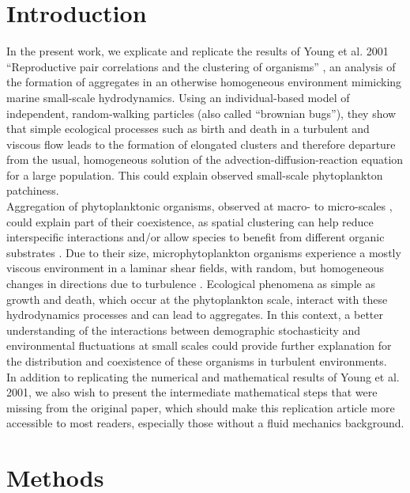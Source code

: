 
\section*{Introduction}

In the present work, we explicate and replicate the results of Young et al. 2001 ``Reproductive pair correlations and the clustering of organisms'' \cite{young_reproductive_2001}, an analysis of the formation of aggregates in an otherwise homogeneous environment mimicking marine small-scale hydrodynamics. Using an individual-based model of independent, random-walking particles (also called ``brownian bugs''), they show that simple ecological processes such as birth and death in a turbulent and viscous flow leads to the formation of elongated clusters and therefore departure from the usual, homogeneous solution of the advection-diffusion-reaction equation for a large population. This could explain observed small-scale phytoplankton patchiness. \\

Aggregation of phytoplanktonic organisms, observed at macro- to micro-scales \citep{lovejoy_universal_2001,pinel2007spatial}, could explain part of their coexistence, as spatial clustering can help reduce interspecific interactions \citep{font-munoz_advection_2017} and/or allow species to benefit from different organic substrates \citep{seymour_resource_2009}. Due to their size, microphytoplankton organisms experience a mostly viscous environment in a laminar shear fields, with random, but homogeneous changes in directions due to turbulence \citep{peters_effects_2000}. Ecological phenomena as simple as growth and death, which occur at the phytoplankton scale, interact with these hydrodynamics processes and can lead to aggregates. In this context, a better understanding of the interactions between demographic stochasticity and environmental fluctuations at small scales could provide further explanation for the distribution and coexistence of these organisms in turbulent environments. \\

In addition to replicating the numerical and mathematical results of Young et al. 2001, we also wish to present the intermediate mathematical steps that were missing from the original paper, which should make this replication article more accessible to most readers, especially those without a fluid mechanics background.  %
 
\section*{Methods}

